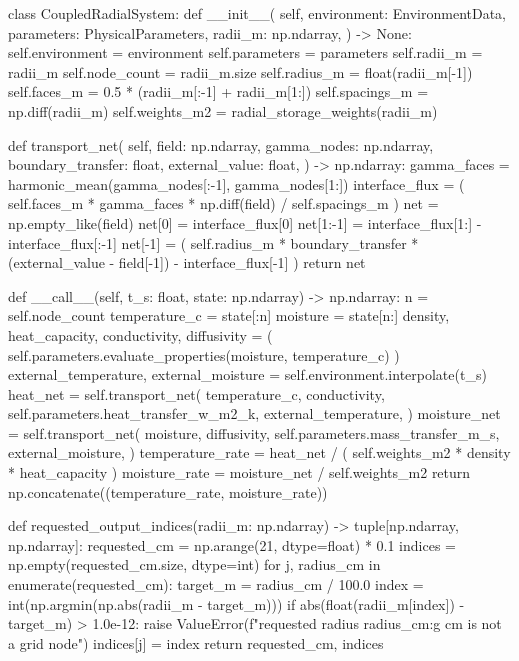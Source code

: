 \documentclass[withoutpreface,bwprint]{cumcmthesis}
\begin{document}
\begin{PythonCode}
class CoupledRadialSystem:
    def __init__(
        self,
        environment: EnvironmentData,
        parameters: PhysicalParameters,
        radii_m: np.ndarray,
    ) -> None:
        self.environment = environment
        self.parameters = parameters
        self.radii_m = radii_m
        self.node_count = radii_m.size
        self.radius_m = float(radii_m[-1])
        self.faces_m = 0.5 * (radii_m[:-1] + radii_m[1:])
        self.spacings_m = np.diff(radii_m)
        self.weights_m2 = radial_storage_weights(radii_m)

    def transport_net(
        self,
        field: np.ndarray,
        gamma_nodes: np.ndarray,
        boundary_transfer: float,
        external_value: float,
    ) -> np.ndarray:
        gamma_faces = harmonic_mean(gamma_nodes[:-1], gamma_nodes[1:])
        interface_flux = (
            self.faces_m
            * gamma_faces
            * np.diff(field)
            / self.spacings_m
        )
        net = np.empty_like(field)
        net[0] = interface_flux[0]
        net[1:-1] = interface_flux[1:] - interface_flux[:-1]
        net[-1] = (
            self.radius_m * boundary_transfer * (external_value - field[-1])
            - interface_flux[-1]
        )
        return net

    def __call__(self, t_s: float, state: np.ndarray) -> np.ndarray:
        n = self.node_count
        temperature_c = state[:n]
        moisture = state[n:]
        density, heat_capacity, conductivity, diffusivity = (
            self.parameters.evaluate_properties(moisture, temperature_c)
        )
        external_temperature, external_moisture = self.environment.interpolate(t_s)
        heat_net = self.transport_net(
            temperature_c,
            conductivity,
            self.parameters.heat_transfer_w_m2_k,
            external_temperature,
        )
        moisture_net = self.transport_net(
            moisture,
            diffusivity,
            self.parameters.mass_transfer_m_s,
            external_moisture,
        )
        temperature_rate = heat_net / (
            self.weights_m2 * density * heat_capacity
        )
        moisture_rate = moisture_net / self.weights_m2
        return np.concatenate((temperature_rate, moisture_rate))


def requested_output_indices(radii_m: np.ndarray) -> tuple[np.ndarray, np.ndarray]:
    requested_cm = np.arange(21, dtype=float) * 0.1
    indices = np.empty(requested_cm.size, dtype=int)
    for j, radius_cm in enumerate(requested_cm):
        target_m = radius_cm / 100.0
        index = int(np.argmin(np.abs(radii_m - target_m)))
        if abs(float(radii_m[index]) - target_m) > 1.0e-12:
            raise ValueError(f"requested radius {radius_cm:g} cm is not a grid node")
        indices[j] = index
    return requested_cm, indices



\end{PythonCode}
\end{document}
